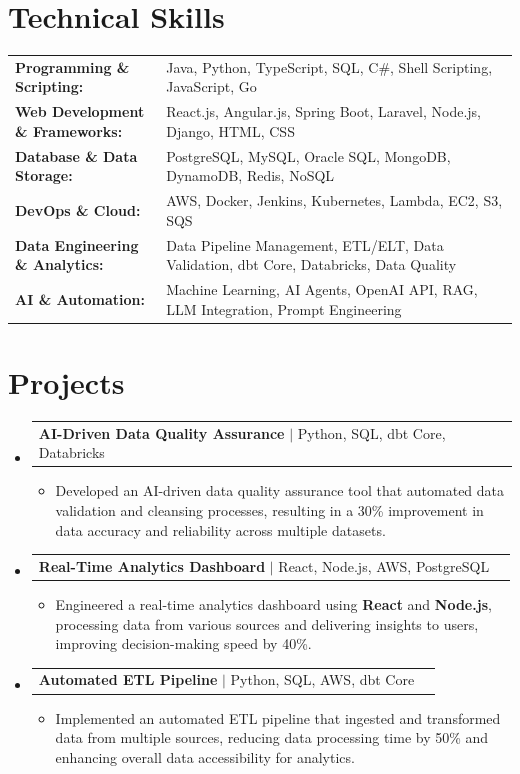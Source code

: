 \documentclass[letterpaper,10pt]{article}
\makeatletter
\newcommand{\resumeItem}[1]{
  \item{\fontsize{8pt}{9pt}\selectfont
    #1 \vspace{-3pt}
  }
}
\newcommand{\resumeProjectHeading}[2]{
    \item
    \begin{tabular*}{1.001\textwidth}{l@{\extracolsep{\fill}}r}
      \fontsize{8.5pt}{10pt}#1 & \textbf{\fontsize{8.5pt}{10pt} #2}\\
    \end{tabular*}\vspace{-7pt}
}
\newcommand{\resumeSubHeadingListStart}{\begin{itemize}[leftmargin=0pt, label={}]}
\newcommand{\resumeSubHeadingListEnd}{\end{itemize}}
\newcommand{\resumeItemListStart}{\begin{itemize}[leftmargin=*]}
\newcommand{\resumeItemListEnd}{\end{itemize}\vspace{-5pt}}
\makeatother
\begin{document}
\section{Technical Skills}
        \vspace{-14pt}
        \begin{table}[h]
            \fontsize{8pt}{9pt}\selectfont
            \begin{tabular}{p{0.3\linewidth} p{0.7\linewidth}}
                \textbf{Programming \& Scripting:} & Java, Python, TypeScript, SQL, C\#, Shell Scripting, JavaScript, Go \\
                \textbf{Web Development \& Frameworks:} & React.js, Angular.js, Spring Boot, Laravel, Node.js, Django, HTML, CSS \\
                \textbf{Database \& Data Storage:} & PostgreSQL, MySQL, Oracle SQL, MongoDB, DynamoDB, Redis, NoSQL \\
                \textbf{DevOps \& Cloud:} & AWS, Docker, Jenkins, Kubernetes, Lambda, EC2, S3, SQS \\
                \textbf{Data Engineering \& Analytics:} & Data Pipeline Management, ETL/ELT, Data Validation, dbt Core, Databricks, Data Quality \\
                \textbf{AI \& Automation:} & Machine Learning, AI Agents, OpenAI API, RAG, LLM Integration, Prompt Engineering \\
            \end{tabular}
        \end{table}
 \vspace{-18pt}

\section{Projects}
    \vspace{-5pt}
    \resumeSubHeadingListStart
          \resumeProjectHeading
            {\textbf{AI-Driven Data Quality Assurance} $|$ Python, SQL, dbt Core, Databricks}{}
            \resumeItemListStart
                \resumeItem{Developed an AI-driven data quality assurance tool that automated data validation and cleansing processes, resulting in a 30\% improvement in data accuracy and reliability across multiple datasets.}
            \resumeItemListEnd
        \vspace{-12pt}
    
        \resumeProjectHeading
            {\textbf{Real-Time Analytics Dashboard} $|$ React, Node.js, AWS, PostgreSQL}{}
        \resumeItemListStart
                \resumeItem{Engineered a real-time analytics dashboard using \textbf{React} and \textbf{Node.js}, processing data from various sources and delivering insights to users, improving decision-making speed by 40\%.}
        \resumeItemListEnd
      \vspace{-12pt}
      \resumeProjectHeading
        {\textbf{Automated ETL Pipeline} $|$ Python, SQL, AWS, dbt Core}{}
    \resumeItemListStart
            \resumeItem{Implemented an automated ETL pipeline that ingested and transformed data from multiple sources, reducing data processing time by 50\% and enhancing overall data accessibility for analytics.}
    \resumeItemListEnd
    \resumeSubHeadingListEnd
\end{document}
